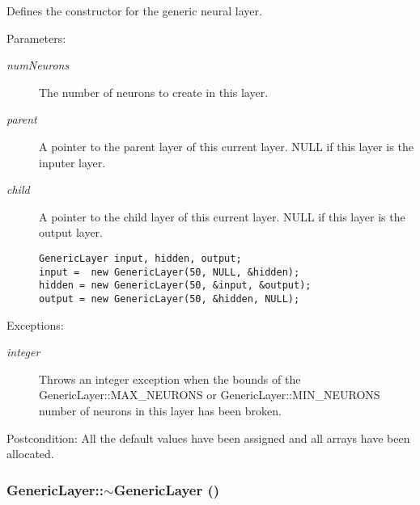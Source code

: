 Defines the constructor for the generic neural layer. \begin{Desc}
\item[Parameters:]
\begin{description}
\item[{\em num\-Neurons}]The number of neurons to create in this layer. \item[{\em parent}]A pointer to the parent layer of this current layer. NULL if this layer is the inputer layer. \item[{\em child}]A pointer to the child layer of this current layer. NULL if this layer is the output layer. 

\begin{DocInclude}\begin{verbatim}GenericLayer input, hidden, output;
input =  new GenericLayer(50, NULL, &hidden);
hidden = new GenericLayer(50, &input, &output);
output = new GenericLayer(50, &hidden, NULL);
\end{verbatim}
\end{DocInclude}
 \end{description}
\end{Desc}
\begin{Desc}
\item[Exceptions:]
\begin{description}
\item[{\em integer}]Throws an integer exception when the bounds of the Generic\-Layer::MAX\_\-NEURONS or Generic\-Layer::MIN\_\-NEURONS number of neurons in this layer has been broken. \end{description}
\end{Desc}
\begin{Desc}
\item[Postcondition:]All the default values have been assigned and all arrays have been allocated. \end{Desc}
\hypertarget{classGenericLayer_3abc382b20bf9585dbba35bb325fff90}{
\subsubsection[$\sim$GenericLayer]{\setlength{\rightskip}{0pt plus 5cm}Generic\-Layer::$\sim$Generic\-Layer ()}}
\label{classGenericLayer_3abc382b20bf9585dbba35bb325fff90}


